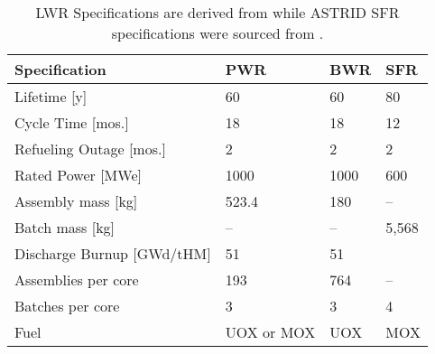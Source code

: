 \begin{table}[h]
	\centering
	\begin{tabularx}{\textwidth}{blll}
		\hline
		\textbf{Specification} & \textbf{\gls{PWR}} & \textbf{\gls{BWR}} & \textbf{\gls{SFR}}\\
		\hline
                Lifetime [y] & 60 & 60 & 80 \\
                Cycle Time [mos.]& 18 & 18 & 12\\ 
                Refueling Outage [mos.]& 2 & 2  & 2\\
                Rated Power [MWe] & 1000 & 1000 & 600\\
                Assembly mass [kg] & 523.4 & 180 & -- \\
                Batch mass [kg] & -- & -- & 5,568\\
                Discharge Burnup [GWd/tHM] & 51 & 51 & \\
                Assemblies per core & 193  & 764 & -- \\
                Batches per core & 3 & 3 & 4\\
                Fuel & \gls{UOX} or \gls{MOX} & \gls{UOX} & \gls{MOX} \\
		\hline
	\end{tabularx}
        \caption {\gls{LWR} Specifications are derived from 
                \cite{duderstadt_nuclear_1976} while \gls{ASTRID} \gls{SFR} 
                specifications were sourced from 
        \cite{varaine_pre-conceptual_2012}.}
	\label{tab:reactor-specs}
	\end{table}

	
\FloatBarrier

